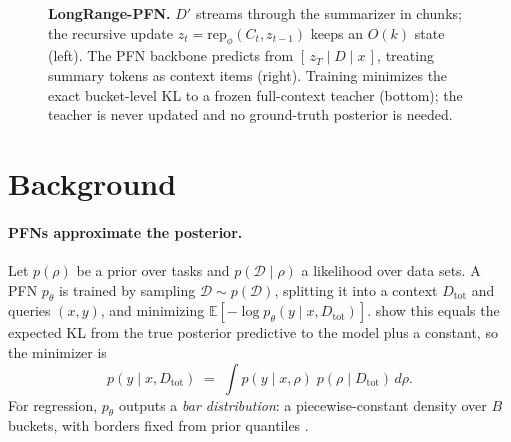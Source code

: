\documentclass[11pt]{article}
\newcommand{\Dtot}{D_{\mathrm{tot}}}
\newcommand{\Dfar}{D'}
\newcommand{\Dloc}{D}
\newcommand{\rep}{\mathrm{rep}}
\begin{document}
\begin{figure}[t]
\caption{\textbf{LongRange-PFN.} $\Dfar$ streams through the summarizer in
chunks; the recursive update $z_t = \rep_\phi(C_t, z_{t-1})$ keeps an
$O(k)$ state (left). The PFN backbone predicts from
$[\,z_T \mid \Dloc \mid x\,]$, treating summary tokens as context items
(right). Training minimizes the exact bucket-level KL to a frozen
full-context teacher (bottom); the teacher is never updated and no
ground-truth posterior is needed.}
\label{fig:schematic}
\end{figure}

\section{Background}
\label{sec:background}

\paragraph{PFNs approximate the posterior.} Let $p(\rho)$ be a prior over
tasks and $p(\mathcal{D} \mid \rho)$ a likelihood over data sets. A PFN
$p_\theta$ is trained by sampling $\mathcal{D} \sim p(\mathcal{D})$,
splitting it into a context $\Dtot$ and queries $(x, y)$, and minimizing
$\mathbb{E}[-\log p_\theta(y \mid x, \Dtot)]$. \citet{muller2022pfn} show
this equals the expected KL from the true posterior predictive to the
model plus a constant, so the minimizer is
\begin{equation}
\label{eq:ppd}
  p(y \mid x, \Dtot) \;=\; \int p(y \mid x, \rho)\; p(\rho \mid \Dtot)\, d\rho .
\end{equation}
For regression, $p_\theta$ outputs a \emph{bar distribution}: a
piecewise-constant density over $B$ buckets, with borders fixed from prior
quantiles \citep{muller2022pfn}.
\end{document}
